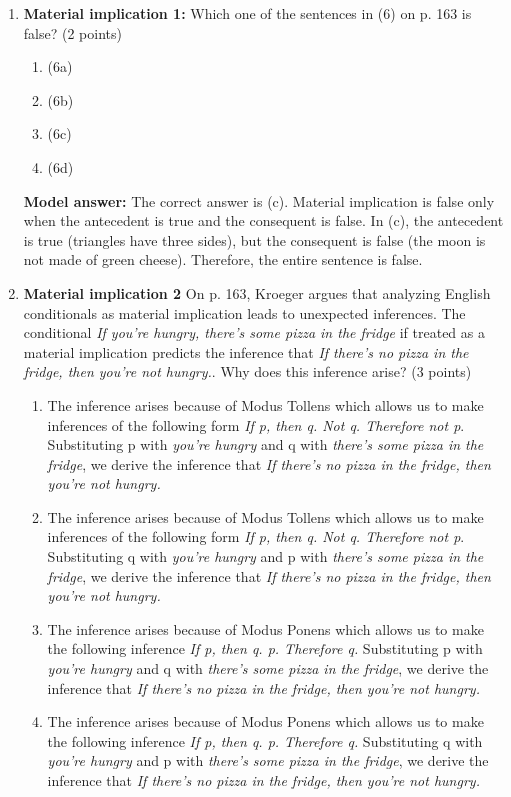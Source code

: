\documentclass[a4,11pt]{article}
\newcommand{\6}{\mbox{$[\hspace*{-.6mm}[$}}
\newcommand{\9}{\mbox{$]\hspace*{-.6mm}]$}}
\begin{document}
\begin{enumerate}[leftmargin = 12pt]
\item { \bf  Material implication 1:} Which one of the sentences in (6) on p. 163 is false? (2 points)

\begin{enumerate}[noitemsep]
\item (6a)
\item  (6b)
\item  (6c)
\item  (6d)
\end{enumerate}

{ \bf Model answer:}  The correct answer is (c). Material implication is false only when the antecedent is true and the consequent is false. In (c), the antecedent is true (triangles have three sides), but the consequent is false (the moon is not made of green cheese). Therefore, the entire sentence is false.

\item { \bf  Material implication 2} On p. 163, Kroeger argues that analyzing English conditionals as material implication leads to  unexpected inferences. The conditional {\it If you’re hungry, there’s some pizza in the fridge} if treated as a material implication predicts the inference that {\it If there’s no pizza in the fridge, then you’re not hungry.}. Why does this inference arise? (3 points)

\begin{enumerate}
\item The inference arises because of Modus Tollens which allows us to make inferences of the following form {\it If p, then q. Not q. Therefore not p}. Substituting p with \textit{you’re hungry} and q with \textit{there’s some pizza in the fridge}, we derive the inference that {\it If there’s no pizza in the fridge, then you’re not hungry.}
\item The inference arises because of Modus Tollens which allows us to make inferences of the following form {\it If p, then q. Not q. Therefore not p}. Substituting q with \textit{you’re hungry} and p with \textit{there’s some pizza in the fridge}, we derive the inference that {\it If there’s no pizza in the fridge, then you’re not hungry.}
\item The inference arises because of Modus Ponens which allows us to make the following inference {\it If p, then q. p. Therefore q.} Substituting p with \textit{you’re hungry} and q with \textit{there’s some pizza in the fridge}, we derive the inference that {\it If there’s no pizza in the fridge, then you’re not hungry.}
\item The inference arises because of Modus Ponens which allows us to make the following inference {\it If p, then q. p. Therefore q.} Substituting q with \textit{you’re hungry} and p with \textit{there’s some pizza in the fridge}, we derive the inference that {\it If there’s no pizza in the fridge, then you’re not hungry.}
\end{enumerate}


\end{enumerate}
\end{document}
